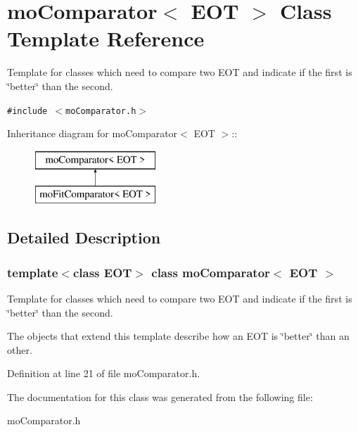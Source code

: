 \section{moComparator$<$ EOT $>$ Class Template Reference}
\label{classmo_comparator}
Template for classes which need to compare two EOT and indicate if the first is \char`\"{}better\char`\"{} than the second.  


{\tt \#include $<$moComparator.h$>$}

Inheritance diagram for moComparator$<$ EOT $>$::\begin{figure}[H]
\begin{center}
\leavevmode
\includegraphics[height=2cm]{classmo_comparator}
\end{center}
\end{figure}


\subsection{Detailed Description}
\subsubsection*{template$<$class EOT$>$ class moComparator$<$ EOT $>$}

Template for classes which need to compare two EOT and indicate if the first is \char`\"{}better\char`\"{} than the second. 

The objects that extend this template describe how an EOT is \char`\"{}better\char`\"{} than an other. 



Definition at line 21 of file moComparator.h.

The documentation for this class was generated from the following file:\begin{CompactItemize}
\item 
moComparator.h\end{CompactItemize}
